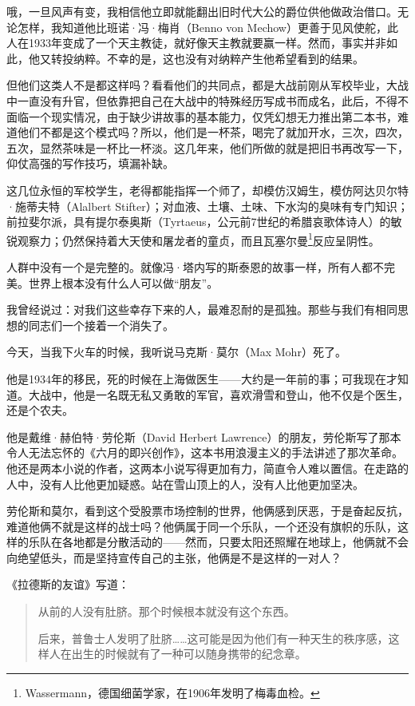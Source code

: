 \documentclass[UTF8]{ctexart}
\begin{document}
哦，一旦风声有变，我相信他立即就能翻出旧时代大公的爵位供他做政治借口。无论怎样，我知道他比班诺·冯·梅肖（Benno von Mechow）更善于见风使舵，此人在1933年变成了一个天主教徒，就好像天主教就要赢一样。然而，事实并非如此，他又转投纳粹。不幸的是，这也没有对纳粹产生他希望看到的结果。

但他们这类人不是都这样吗？看看他们的共同点，都是大战前刚从军校毕业，大战中一直没有升官，但依靠把自己在大战中的特殊经历写成书而成名，此后，不得不面临一个现实情况，由于缺少讲故事的基本能力，仅凭幻想无力推出第二本书，难道他们不都是这个模式吗？所以，他们是一杯茶，喝完了就加开水，三次，四次，五次，显然茶味是一杯比一杯淡。这几年来，他们所做的就是把旧书再改写一下，仰仗高强的写作技巧，填漏补缺。

这几位永恒的军校学生，老得都能指挥一个师了，却模仿汉姆生，模仿阿达贝尔特·施蒂夫特（Alalbert Stifter）；对血液、土壤、土味、下水沟的臭味有专门知识；前拉斐尔派，具有提尔泰奥斯（Tyrtaeus，公元前7世纪的希腊哀歌体诗人）的敏锐观察力；仍然保持着大天使和屠龙者的童贞，而且瓦塞尔曼\footnote{Wassermann，德国细菌学家，在1906年发明了梅毒血检。}反应呈阴性。

人群中没有一个是完整的。就像冯·塔内写的斯泰恩的故事一样，所有人都不完美。世界上根本没有什么人可以做“朋友”。

我曾经说过：对我们这些幸存下来的人，最难忍耐的是孤独。那些与我们有相同思想的同志们一个接着一个消失了。

今天，当我下火车的时候，我听说马克斯·莫尔（Max Mohr）死了。

他是1934年的移民，死的时候在上海做医生——大约是一年前的事；可我现在才知道。大战中，他是一名既无私又勇敢的军官，喜欢滑雪和登山，他不仅是个医生，还是个农夫。

他是戴维·赫伯特·劳伦斯（David Herbert Lawrence）的朋友，劳伦斯写了那本令人无法忘怀的《六月的即兴创作》，这本书用浪漫主义的手法讲述了那次革命。他还是两本小说的作者，这两本小说写得更加有力，简直令人难以置信。在走路的人中，没有人比他更加疑惑。站在雪山顶上的人，没有人比他更加坚决。

劳伦斯和莫尔，看到这个受股票市场控制的世界，他俩感到厌恶，于是奋起反抗，难道他俩不就是这样的战士吗？他俩属于同一个乐队，一个还没有旗帜的乐队，这样的乐队在各地都是分散活动的——然而，只要太阳还照耀在地球上，他俩就不会向绝望低头，而是坚持宣传自己的主张，他俩是不是这样的一对人？

《拉德斯的友谊》写道：

\begin{quote}
从前的人没有肚脐。那个时候根本就没有这个东西。

后来，普鲁士人发明了肚脐……这可能是因为他们有一种天生的秩序感，这样人在出生的时候就有了一种可以随身携带的纪念章。
\end{quote}
\end{document}
